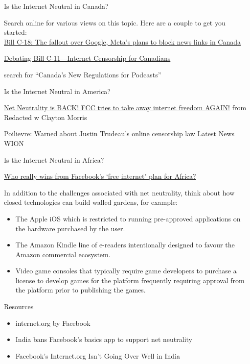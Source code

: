 \documentclass[
]{book}
\providecommand{\tightlist}{%
  \setlength{\itemsep}{0pt}\setlength{\parskip}{0pt}}
\theoremstyle{definition}
\theoremstyle{definition}
\theoremstyle{definition}
\theoremstyle{definition}
\theoremstyle{remark}
\begin{document}
\begin{reflect}
Is the Internet Neutral in Canada?

Search online for various views on this topic. Here are a couple to get you started:\\
\href{https://www.youtube.com/watch?v=W5YLvCEd1yE}{Bill C-18: The fallout over Google, Meta's plans to block news links in Canada}

\href{https://www.youtube.com/watch?v=bmd4sASKFRw}{Debating Bill C-11---Internet Censorship for Canadians}

search for ``Canada's New Regulations for Podcasts''

Is the Internet Neutral in America?

\href{https://www.youtube.com/watch?v=DCfWzAM-JeY}{Net Neutrality is BACK! FCC tries to take away internet freedom AGAIN!} from Redacted w Clayton Morris

Poilievre: Warned about Justin Trudeau's online censorship law \textbar{} Latest News \textbar{} WION

Is the Internet Neutral in Africa?

\href{https://www.zdnet.com/article/who-really-wins-from-facebooks-free-internet-plan-for-africa/}{Who really wins from Facebook's `free internet' plan for Africa?}

In addition to the challenges associated with net neutrality, think about how closed technologies can build walled gardens, for example:

\begin{itemize}
\tightlist
\item
  The Apple iOS which is restricted to running pre-approved applications on the hardware purchased by the user.\\
\item
  The Amazon Kindle line of e-readers intentionally designed to favour the Amazon commercial ecosystem.\\
\item
  Video game consoles that typically require game developers to purchase a license to develop games for the platform frequently requiring approval from the platform prior to publishing the games.
\end{itemize}

Resources

\begin{itemize}
\tightlist
\item
  internet.org by Facebook\\
\item
  India bans Facebook's basics app to support net neutrality\\
\item
  Facebook's Internet.org Isn't Going Over Well in India
\end{itemize}


\end{reflect}
\end{document}
